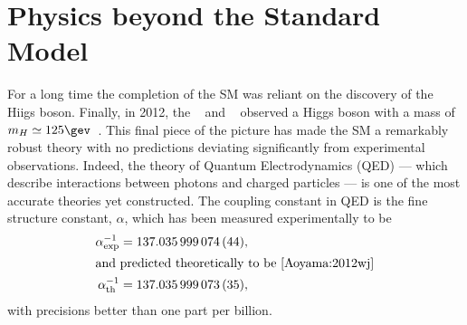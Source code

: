 \section{Physics beyond the Standard Model}
\label{sec:bsm}

For a long time the completion of the SM was reliant on the discovery of the Hiigs boson.
Finally, in 2012, the \cms~\cite{Chatrchyan:2008aa} and \atlas~\cite{Aad:2008zzm} observed a Higgs
boson with a mass of $m_H\simeq125\gev$~\cite{Chatrchyan:2012ufa,Aad:2012tfa}.
This final piece of the picture has made the SM a remarkably robust theory with no predictions
deviating significantly from experimental observations.
Indeed, the theory of Quantum Electrodynamics (QED) --- which describe interactions between
photons and charged particles --- is one of the most accurate theories yet constructed.
The coupling constant in QED is the fine structure constant, $\alpha$, which has been measured
experimentally to be~\cite{PDG2012}
\begin{align}
  \alpha^{-1}_\mathrm{exp} &= 137.035\,999\,074\,(44), \nonumber\\
  \intertext{and predicted theoretically to be~\cite{Aoyama:2012wj}}
  \alpha^{-1}_\mathrm{th} &= 137.035\,999\,073\,(35), \nonumber
\end{align}
with precisions better than one part per billion.



